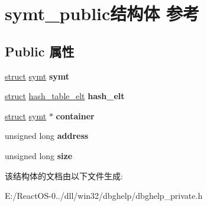 \hypertarget{structsymt__public}{}\section{symt\+\_\+public结构体 参考}
\label{structsymt__public}
\subsection*{Public 属性}
\begin{DoxyCompactItemize}
\item 
\mbox{\label{structsymt__public_a884b98fd7f40f1dfeeb999775fcfb126}} 
\hyperlink{interfacestruct}{struct} \hyperlink{structsymt}{symt} {\bfseries symt}
\item 
\mbox{\label{structsymt__public_a0992872aa560ffd7a68a2ed41eb98df4}} 
\hyperlink{interfacestruct}{struct} \hyperlink{structhash__table__elt}{hash\+\_\+table\+\_\+elt} {\bfseries hash\+\_\+elt}
\item 
\mbox{\label{structsymt__public_a37d055a5e322f7c8777fc050a05650af}} 
\hyperlink{interfacestruct}{struct} \hyperlink{structsymt}{symt} $\ast$ {\bfseries container}
\item 
\mbox{\label{structsymt__public_a896f3482cea59b2ddedf4db41f8c972d}} 
unsigned long {\bfseries address}
\item 
\mbox{\label{structsymt__public_a36e188211872e57334e19ddd1d8e6035}} 
unsigned long {\bfseries size}
\end{DoxyCompactItemize}


该结构体的文档由以下文件生成\+:\begin{DoxyCompactItemize}
\item 
E\+:/\+React\+O\+S-\/0../dll/win32/dbghelp/dbghelp\+\_\+private.\+h\end{DoxyCompactItemize}
